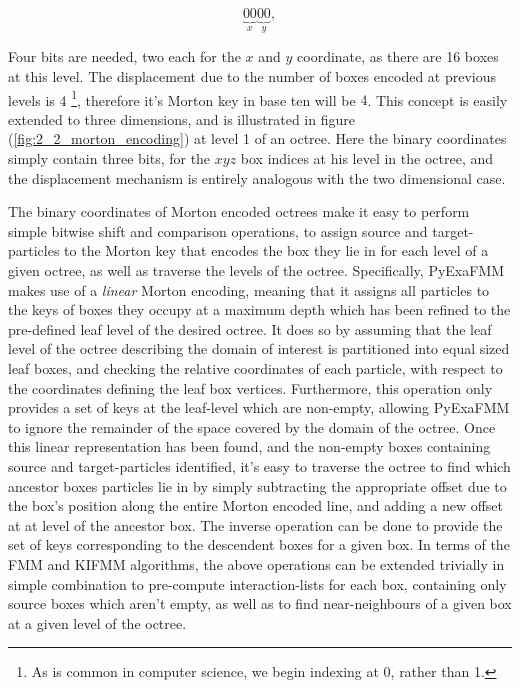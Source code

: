  \begin{equation}
    \underbrace{00}_{x}\underbrace{00}_{y},
\end{equation}

Four bits are needed, two each for the $x$ and $y$ coordinate, as there are 16
 boxes at this level. The displacement due to the number of boxes encoded at
 previous levels is 4 \footnote{As is common in computer science, we begin indexing at 0, rather than 1.},
therefore it's Morton \gls{key} in base ten will be $4$. This concept is easily
extended to three dimensions, and is illustrated in
figure (\ref{fig:2_2_morton_encoding}) at level 1 of an octree. Here the binary
coordinates simply contain three bits, for the $xyz$ box indices
at his level in the octree, and the displacement mechanism is entirely analogous with the
two dimensional case.

The binary coordinates of Morton encoded octrees make it easy to perform simple
bitwise shift and comparison operations, to assign source and \gls{target-particles} to the Morton key
that encodes the box they lie in for each level of a given octree, as well as traverse the levels of
the octree. Specifically, \gls{PyExaFMM} makes use of a \textit{linear} Morton encoding, meaning that it assigns
all particles to the keys of boxes they occupy at a maximum depth which has been refined to the
pre-defined leaf level of the desired octree. It does so by assuming that the
leaf level of the octree describing the domain of interest is partitioned into equal
sized leaf boxes, and checking the relative coordinates of each particle, with respect to the coordinates defining
the leaf box vertices. Furthermore, this operation only provides
a set of keys at the leaf-level which are non-empty, allowing \gls{PyExaFMM} to
ignore the remainder of the space covered by the domain of the octree. Once this
linear representation has been found, and the non-empty boxes containing
source and \gls{target-particles} identified, it's easy to traverse the octree
to find which ancestor boxes particles lie in by simply subtracting the appropriate
offset due to the box's position along the entire Morton encoded line, and adding a new offset at
at level of the ancestor box. The inverse operation can be done to provide the set
of keys corresponding to the descendent boxes for a given box. In terms of the
\gls{FMM} and \gls{KIFMM} algorithms, the above operations can be extended trivially
in simple combination to pre-compute \gls{interaction-list}s for each box, containing
only source boxes which aren't empty, as well as to find \gls{near-neighbours} of
a given box at a given level of the octree.

